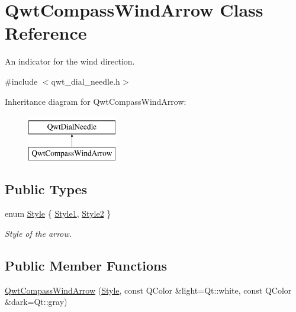 \hypertarget{class_qwt_compass_wind_arrow}{\section{Qwt\-Compass\-Wind\-Arrow Class Reference}
\label{class_qwt_compass_wind_arrow}
}


An indicator for the wind direction.  




{\ttfamily \#include $<$qwt\-\_\-dial\-\_\-needle.\-h$>$}

Inheritance diagram for Qwt\-Compass\-Wind\-Arrow\-:\begin{figure}[H]
\begin{center}
\leavevmode
\includegraphics[height=2.000000cm]{class_qwt_compass_wind_arrow}
\end{center}
\end{figure}
\subsection*{Public Types}
\begin{DoxyCompactItemize}
\item 
enum \hyperlink{class_qwt_compass_wind_arrow_a55f11e28c9d87c0fb7c306ccd174f2a8}{Style} \{ \hyperlink{class_qwt_compass_wind_arrow_a55f11e28c9d87c0fb7c306ccd174f2a8a62b689f03b4e974660ce1241942b09fc}{Style1}, 
\hyperlink{class_qwt_compass_wind_arrow_a55f11e28c9d87c0fb7c306ccd174f2a8a44a462b3f0fa85bf3fa8dc421484e529}{Style2}
 \}
\begin{DoxyCompactList}\small\item\em Style of the arrow. \end{DoxyCompactList}\end{DoxyCompactItemize}
\subsection*{Public Member Functions}
\begin{DoxyCompactItemize}
\item 
\hyperlink{class_qwt_compass_wind_arrow_a1b5931f43dd7e72fc5a3e2c9b509769d}{Qwt\-Compass\-Wind\-Arrow} (\hyperlink{class_qwt_compass_wind_arrow_a55f11e28c9d87c0fb7c306ccd174f2a8}{Style}, const Q\-Color \&light=Qt\-::white, const Q\-Color \&dark=Qt\-::gray)
\end{DoxyCompactItemize}
